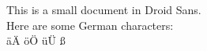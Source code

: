 \documentclass{article}
\begin{document}
This is a small document in Droid Sans.
\\
Here are some German characters:
\\
äÄ öÖ üÜ ß
\end{document}
